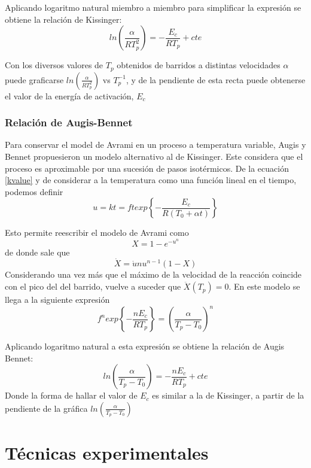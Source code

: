 \documentclass{article}
\theoremstyle{definition}
\theoremstyle{remark}
\begin{document}
Aplicando logaritmo natural miembro a miembro para simplificar la expresión se obtiene la relación de Kissinger:
\begin{equation}
	ln(\frac{\alpha}{R T_p^2}) = -\frac{E_c}{RT_p} + cte
\end{equation}

Con los diversos valores de $T_p$ obtenidos de barridos a distintas velocidades $\alpha$ puede graficarse $ln(\frac{\alpha}{R T_p^2})$ vs $T_p^{-1}$, y de la pendiente de esta recta puede obtenerse el valor de la energía de activación, $E_c$
\subsubsection{Relación de Augis-Bennet}
Para conservar el model de Avrami en un proceso a temperatura variable, Augis y Bennet propuesieron un modelo alternativo al de Kissinger. Este considera que el proceso es aproximable por una sucesión de pasos isotérmicos.
De la ecuación \ref{kvalue} y de considerar a la temperatura como una función lineal en el tiempo, podemos definir
\begin{equation}
	u = kt = ft exp \left\lbrace -\frac{E_c}{R(T_0 + \alpha t)} \right\rbrace
\end{equation}

Esto permite reescribir el modelo de Avrami como 
\begin{equation}
	X = 1-e^{-u^{n}}
\end{equation}
de donde sale que
\begin{equation}
	\dot{X} = \dot{u}nu^{n-1}(1-X)
\end{equation}
Considerando una vez más que el máximo de la velocidad de la reacción coincide con el pico del del barrido, vuelve a suceder que $\ddot{X}(T_p) = 0$. En este modelo se llega a la siguiente expresión
\begin{equation}
	f^n exp \left\lbrace -\frac{n E_c}{RT_p} \right\rbrace = (\frac{\alpha}{T_p - T_0})^n
\end{equation}

Aplicando logaritmo natural a esta expresión se obtiene la relación de Augis Bennet:
\begin{equation}
	ln(\frac{\alpha}{T_p - T_0}) = -\frac{n E_c}{RT_p} + cte
\end{equation}
Donde la forma de hallar el valor de $E_c$ es similar a la de Kissinger, a partir de la pendiente de la gráfica $ln(\frac{\alpha}{T_p - T_0})$

\section{Técnicas experimentales}
\end{document}
